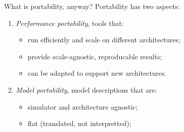 \documentclass[aspectratio=43]{beamer}
\newcommand{\arbor}{{\ttfamily Arbor}\xspace}
\begin{document}
%

\begin{frame}[fragile]{What is portability, anyway?}
Portability has two aspects:

\begin{enumerate}
\item \emph{Performance portability}, tools that:
    \begin{itemize}
        \item run efficiently and scale on different architectures;
        \item provide scale-agnostic, reproducable results;
        \item can be adapted to support new architectures.
    \end{itemize}

    \item \emph{Model portability}, model descriptions that are:
    \begin{itemize}
        \item simulator and architecture agnostic;
        \item flat (translated, not interpretted);
    \end{itemize}
\end{enumerate}

\end{frame}
\end{document}
